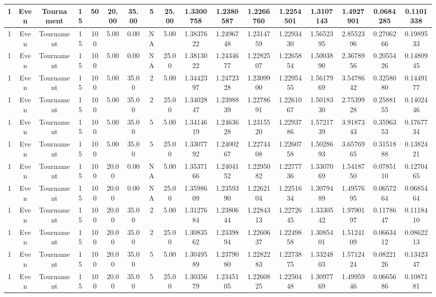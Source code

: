\documentclass[a4paper]{article}
\begin{document}
\begin{center}
\begin{tabular}{ | c | c | c | c | c | c | c | c | c | c | c | c | c | c | c | c | c | }
		\hline
		1	&	Even	&	Tournament	&	15	&	50	&	20.00	&	35.00	&	5	&	25.00	&	1.3300758	&	1.2380587	&	1.2266760	&	1.2254501	&	1.3107143	&	1.4927901	&	0.0684285	&	0.1101338 \\
		\hline
		1	&	Even	&	Tournament	&	15	&	100	&	5.00	&	0.00	&	NA	&	5.00	&	1.3837622	&	1.2496748	&	1.2314759	&	1.2293430	&	1.5652395	&	2.8552396	&	0.2706266	&	0.1989533 \\
		\hline
		1	&	Even	&	Tournament	&	15	&	100	&	5.00	&	0.00	&	NA	&	25.00	&	1.3813022	&	1.2434677	&	1.2282507	&	1.2265854	&	1.5003890	&	2.3678956	&	0.2055426	&	0.1480945 \\
		\hline
		1	&	Even	&	Tournament	&	15	&	100	&	5.00	&	35.00	&	2	&	5.00	&	1.3442397	&	1.2472328	&	1.2309900	&	1.2295455	&	1.5617969	&	3.5478642	&	0.3258080	&	0.1449177 \\
		\hline
		1	&	Even	&	Tournament	&	15	&	100	&	5.00	&	35.00	&	2	&	25.00	&	1.3402847	&	1.2398839	&	1.2278691	&	1.2261067	&	1.5018330	&	2.7539928	&	0.2588155	&	0.1402446 \\
		\hline
		1	&	Even	&	Tournament	&	15	&	100	&	5.00	&	35.00	&	5	&	5.00	&	1.3414619	&	1.2463628	&	1.2315520	&	1.2293786	&	1.5721739	&	3.9187343	&	0.3596353	&	0.1767734 \\
		\hline
		1	&	Even	&	Tournament	&	15	&	100	&	5.00	&	35.00	&	5	&	25.00	&	1.3307792	&	1.2400267	&	1.2274408	&	1.2260758	&	1.5028693	&	3.6576965	&	0.3151888	&	0.1382421 \\
		\hline
		1	&	Even	&	Tournament	&	15	&	100	&	20.00	&	0.00	&	NA	&	5.00	&	1.3537166	&	1.2404152	&	1.2295082	&	1.2277736	&	1.3307069	&	1.5418750	&	0.0785110	&	0.1270465 \\
		\hline
		1	&	Even	&	Tournament	&	15	&	100	&	20.00	&	0.00	&	NA	&	25.00	&	1.3598609	&	1.2359390	&	1.2262104	&	1.2251634	&	1.3079489	&	1.4957695	&	0.0657264	&	0.0685464 \\
		\hline
		1	&	Even	&	Tournament	&	15	&	100	&	20.00	&	35.00	&	2	&	5.00	&	1.3127684	&	1.2380644	&	1.2284313	&	1.2272645	&	1.3330542	&	1.9790197	&	0.1178647	&	0.1118410 \\
		\hline
		1	&	Even	&	Tournament	&	15	&	100	&	20.00	&	35.00	&	2	&	25.00	&	1.3083562	&	1.2339894	&	1.2260637	&	1.2249858	&	1.3085401	&	1.5124109	&	0.0663412	&	0.0862213 \\
		\hline
		1	&	Even	&	Tournament	&	15	&	100	&	20.00	&	35.00	&	5	&	5.00	&	1.3049589	&	1.2379080	&	1.2282283	&	1.2273875	&	1.3324803	&	1.5712424	&	0.0822126	&	0.1342347 \\
		\hline
		1	&	Even	&	Tournament	&	15	&	100	&	20.00	&	35.00	&	5	&	25.00	&	1.3035679	&	1.2345105	&	1.2260825	&	1.2250448	&	1.3097769	&	1.4995946	&	0.0665686	&	0.1087181 \\

\end{tabular}
\end{center}
\end{document}
